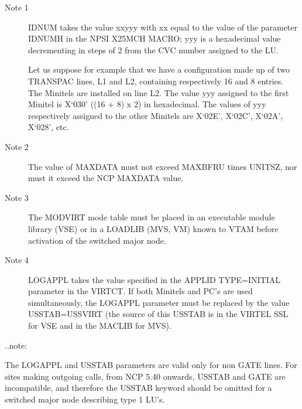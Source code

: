 \documentclass[letterpaper,10pt,english]{sphinxmanual}
\begin{document}
\begin{sphinxVerbatim}[commandchars=\\\{\}]
                         
\end{sphinxVerbatim}
\begin{description}
\item[{Note 1}] \leavevmode
IDNUM takes the value xxyyy with xx equal to the value of the parameter IDNUMH in the NPSI X25MCH MACRO; yyy is a hexadecimal value decrementing in steps of 2 from the CVC number assigned to the LU.

Let us suppose for example that we have a configuration made up of two TRANSPAC lines, L1 and L2, containing respectively 16 and 8 entries. The Minitels are installed on line L2. The value yyy assigned to the first Minitel is X‘030’ ((16 + 8) x 2) in hexadecimal. The values of yyy respectively assigned to the other Minitels are X‘02E’, X‘02C’, X‘02A’, X‘028’, etc.

\item[{Note 2}] \leavevmode
The value of MAXDATA must not exceed MAXBFRU times UNITSZ, nor must it exceed the NCP MAXDATA value.

\item[{Note 3}] \leavevmode
The MODVIRT mode table must be placed in an executable module library (VSE) or in a LOADLIB (MVS, VM) known to VTAM before activation of the switched major node.

\item[{Note 4}] \leavevmode
LOGAPPL takes the value specified in the APPLID TYPE=INITIAL parameter in the VIRTCT. If both Minitels and PC’s are used simultaneously, the LOGAPPL parameter must be replaced by the value USSTAB=USSVIRT (the source of this USSTAB is in the VIRTEL SSL for VSE and in the MACLIB for MVS).

\end{description}

..note:

\begin{sphinxVerbatim}[commandchars=\\\{\}]
The LOGAPPL and USSTAB parameters are valid only for non GATE lines. For sites making outgoing calls, from NCP 5.40 onwards, USSTAB and GATE are incompatible, and therefore the USSTAB keyword should be omitted for a switched major node describing type 1 LU’s.
\end{sphinxVerbatim}
\end{document}
